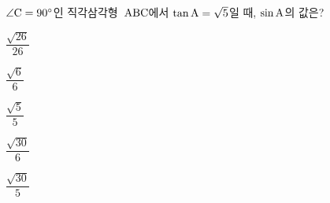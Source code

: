 $\angle\mathrm{C}=90^\circ$인 직각삼각형~$\mathrm{ABC}$에서 $\tan\mathrm{A}=\sqrt{5}$일 때, $\sin\mathrm{A}$의 값은?
\begin{choices32}{\rule[-3ex]{0pt}{8ex}$\dfrac{\sqrt{26}}{26}$}{\rule[-3ex]{0pt}{8ex}$\dfrac{\sqrt{6}}{6}$}{\rule[-3ex]{0pt}{8ex}$\dfrac{\sqrt{5}}{5}$}{\rule[-3ex]{0pt}{8ex}$\dfrac{\sqrt{30}}{6}$}{\rule[-3ex]{0pt}{8ex}$\dfrac{\sqrt{30}}{5}$}\end{choices32}
